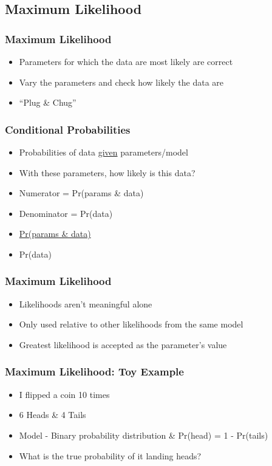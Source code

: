 \documentclass[14pt,handout]{beamer}
\begin{document}
\subsection{Maximum Likelihood}

\begin{frame}
\frametitle{Maximum Likelihood}
\begin{itemize}
	\item<+-> Parameters for which the data are most likely are correct
	\item<+-> Vary the parameters and check how likely the data are
	\item<+-> ``Plug \& Chug''
\end{itemize}
\end{frame}

\begin{frame}
\frametitle{Conditional Probabilities}
\begin{itemize}
	\item<+-> Probabilities of data \underline{given} parameters/model
	\item<+-> With these parameters, how likely is this data?
	\item<+-> Numerator = Pr(params \& data)
	\item<+-> Denominator = Pr(data)
	\item<+->[] \underline{Pr(params \& data)}
	\item<+->[] Pr(data)
\end{itemize}
\end{frame}

\begin{frame}
\frametitle{Maximum Likelihood}
\begin{itemize}
	\item<+-> Likelihoods aren't meaningful alone
	\item<+-> Only used relative to other likelihoods from the same model
	\item<+-> Greatest likelihood is accepted as the parameter's value
\end{itemize}
\end{frame}

\begin{frame}
\frametitle{Maximum Likelihood: Toy Example}
\begin{itemize}
	\item<+-> I flipped a coin 10 times
	\item<+-> 6 Heads \& 4 Tails
	\item<+-> Model - Binary probability distribution \& Pr(head) = 1 - Pr(tails)
	\item<+-> What is the true probability of it landing heads?
\end{itemize}
\end{frame}
\end{document}
